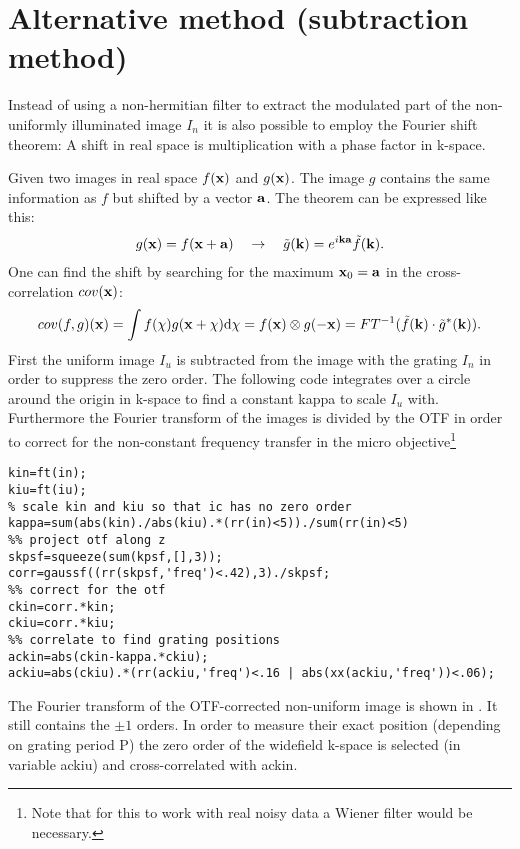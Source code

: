 \section{Alternative method (subtraction method)}
Instead of using a non-hermitian filter to extract the modulated part
of the non-uniformly illuminated image $I_n$ it is also possible to
employ the Fourier shift theorem: A shift in real space is 
multiplication with a phase factor in k-space. 

Given two images in real space $f(\mathbf{x})$ and $g(\mathbf{x})$. The
image $g$ contains the same information as $f$ but shifted by a vector
$\mathbf{a}$. The theorem can be expressed like this:
\begin{align}
  g(\mathbf{x})=f(\mathbf{x}+\mathbf{a})
  \quad
  \rightarrow
  \quad
  \tilde g(\mathbf{k})=e^{i\mathbf{k}\mathbf{a}}\tilde f(\mathbf{k}).
\end{align}
One can find the shift by searching for the maximum $\mathbf{x}_0=\mathbf{a}$ in
the cross-correlation $cov(\mathbf{x})$:
\begin{align}
  cov(f,g)(\mathbf{x})
  =\int f(\mathbf{\chi}) g(\mathbf{x}+\mathbf{\chi}) \textrm{d}\mathbf{\chi}
  =f(\mathbf{x})\otimes g(-\mathbf{x})
  =FT^{-1}(\tilde f(\mathbf{k})\cdot\tilde g^*(\mathbf{k})).
\end{align}
First the uniform image $I_u$ is subtracted from the image with the
grating $I_n$ in order to suppress the zero order. The following code
integrates over a circle around the origin in k-space to find a
constant {\sf kappa} to scale $I_u$ with. Furthermore the
Fourier transform of the images is divided by the OTF in order to
correct for the non-constant frequency transfer in the micro
objective\footnote{Note that for this to work with real noisy data a
  Wiener filter would be necessary.}
\begin{lstlisting}
kin=ft(in);
kiu=ft(iu);
% scale kin and kiu so that ic has no zero order
kappa=sum(abs(kin)./abs(kiu).*(rr(in)<5))./sum(rr(in)<5)
%% project otf along z
skpsf=squeeze(sum(kpsf,[],3));
corr=gaussf((rr(skpsf,'freq')<.42),3)./skpsf;
%% correct for the otf
ckin=corr.*kin;
ckiu=corr.*kiu;
%% correlate to find grating positions
ackin=abs(ckin-kappa.*ckiu);
ackiu=abs(ckiu).*(rr(ackiu,'freq')<.16 | abs(xx(ackiu,'freq'))<.06);
\end{lstlisting}
The Fourier transform of the OTF-corrected non-uniform image is shown
in . It still contains the $\pm1$ orders. In order
to measure their exact position (depending on grating period {\sf P})
the zero order of the widefield k-space is selected (in variable {\sf
  ackiu}) and cross-correlated with {\sf ackin}.

